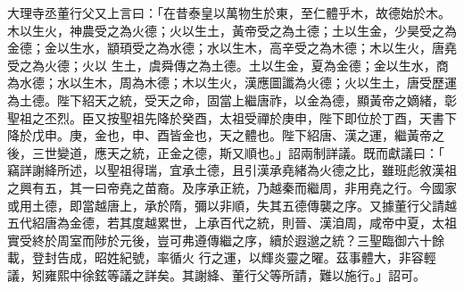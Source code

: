 \begin{pinyinscope}
 大理寺丞董行父又上言曰：「在昔泰皇以萬物生於東，至仁體乎木，故德始於木。木以生火，神農受之為火德；火以生土，黃帝受之為土德；土以生金，少昊受之為金德；金以生水，顓頊受之為水德；水以生木，高辛受之為木德；木以生火，唐堯受之為火德；火以
 生土，虞舜傳之為土德。土以生金，夏為金德；金以生水，商為水德；水以生木，周為木德；木以生火，漢應圖讖為火德；火以生土，唐受歷運為土德。陛下紹天之統，受天之命，固當上繼唐祚，以金為德，顯黃帝之嫡緒，彰聖祖之丕烈。臣又按聖祖先降於癸酉，太祖受禪於庚申，陛下即位於丁酉，天書下降於戊申。庚，金也，申、酉皆金也，天之體也。陛下紹唐、漢之運，繼黃帝之後，三世變道，應天之統，正金之德，斯又順也。」詔兩制詳議。既而獻議曰：「
 竊詳謝絳所述，以聖祖得瑞，宜承土德，且引漢承堯緒為火德之比，雖班彪敘漢祖之興有五，其一曰帝堯之苗裔。及序承正統，乃越秦而繼周，非用堯之行。今國家或用土德，即當越唐上，承於隋，彌以非順，失其五德傳襲之序。又據董行父請越五代紹唐為金德，若其度越累世，上承百代之統，則晉、漢洎周，咸帝中夏，太祖實受終於周室而陟於元後，豈可弗遵傳繼之序，續於遐邈之統？三聖臨御六十餘載，登封告成，昭姓紀號，率循火
 行之運，以輝炎靈之曜。茲事體大，非容輕議，矧雍熙中徐鉉等議之詳矣。其謝絳、董行父等所請，難以施行。」詔可。



\end{pinyinscope}